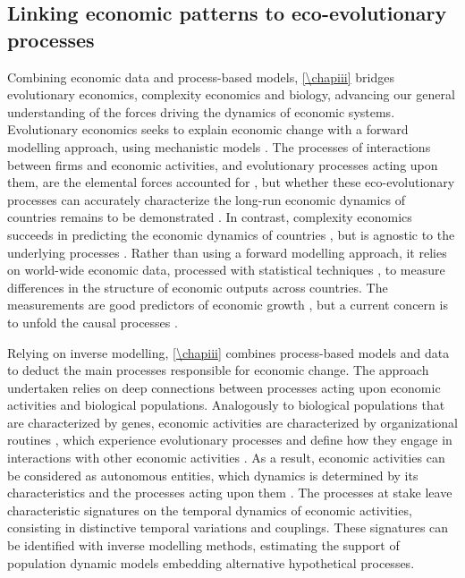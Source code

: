 \subsection{Linking economic patterns to eco-evolutionary processes}

Combining economic data and process-based models, \cref{\chapiii} bridges evolutionary economics, complexity economics and biology, advancing our general understanding of the forces driving the dynamics of economic systems.
% 
Evolutionary economics seeks to explain economic change with a forward modelling approach, using mechanistic models \citep{nelson1985evolutionary}.
% 
The processes of interactions between firms and economic activities, and evolutionary processes acting upon them, are the elemental forces accounted for \citep{Metcalfe2006}, but whether these eco-evolutionary processes can accurately characterize the long-run economic dynamics of countries remains to be demonstrated \citep{Hodgson2019}.
% 
In contrast, complexity economics succeeds in predicting the economic dynamics of countries \citep{Hidalgo2021}, but is agnostic to the underlying processes \citep{Hidalgo2021}. Rather than using a forward modelling approach, it relies on world-wide economic data, processed with statistical techniques \citep{Mealy2019}, to measure differences in the structure of economic outputs across countries. The measurements are good predictors of economic growth \citep{Tacchella2018}, but a current concern is to unfold the causal processes \citep{Hidalgo2021}.

Relying on inverse modelling, \cref{\chapiii} combines process-based models and data to deduct the main processes responsible for economic change.
% 
The approach undertaken relies on deep connections between processes acting upon economic activities and biological populations.
% 
Analogously to biological populations that are characterized by genes, economic activities are characterized by organizational routines \citep{nelson1985evolutionary}, which experience evolutionary processes and define how they engage in interactions with other economic activities \citep{nelson1985evolutionary}.
% 
As a result, economic activities can be considered as autonomous entities, which dynamics is determined by its characteristics and the processes acting upon them \citep{Boschma2005a}.
% 
The processes at stake leave characteristic signatures on the temporal dynamics of economic activities, consisting in distinctive temporal variations and couplings.
% 
These signatures can be identified with inverse modelling methods, estimating the support of population dynamic models embedding alternative hypothetical processes.

